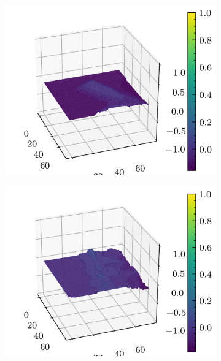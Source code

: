 \documentclass[../document.tex]{subfiles}
\begin{document}
\begin{figure}[H]
\begin{subfigure}[b]{0.19\textwidth}
        \includegraphics[width=\linewidth]{../img/5/quarry/false_negative/patch-3d-2.png}
    \end{subfigure}
    \begin{subfigure}[b]{0.19\textwidth}
        \includegraphics[width=\linewidth]{../img/5/quarry/false_negative/patch-3d-3.png}
    \end{subfigure}  
    \begin{subfigure}[b]{0.19\textwidth}

\end{subfigure}
\end{figure}
\end{document}
